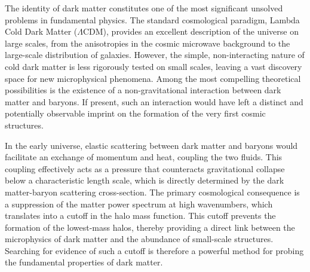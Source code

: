 \documentclass[]{article}
\begin{document}
The identity of dark matter constitutes one of the most significant unsolved problems in fundamental physics.\citep{bahcall2016dark} The standard cosmological paradigm, Lambda Cold Dark Matter ($\Lambda$CDM), provides an excellent description of the universe on large scales, from the anisotropies in the cosmic microwave background to the large-scale distribution of galaxies.\citep{van_den_Aarssen_2012,vandenaarssen2013is,chatterjee2024rulingstronglyinteractingdark,martins2009distributiondarkmattergalaxies,speliotopoulos2007darkenergystructureformation,teixeira2024illuminatingdarksectorsearching} However, the simple, non-interacting nature of cold dark matter is less rigorously tested on small scales, leaving a vast discovery space for new microphysical phenomena.\citep{van_den_Aarssen_2012,vandenaarssen2013is,chatterjee2024rulingstronglyinteractingdark,martins2009distributiondarkmattergalaxies,speliotopoulos2007darkenergystructureformation,brito2022snowmass2021cosmicfrontierwhite} Among the most compelling theoretical possibilities is the existence of a non-gravitational interaction between dark matter and baryons.\citep{van_den_Aarssen_2012,vandenaarssen2013is} If present, such an interaction would have left a distinct and potentially observable imprint on the formation of the very first cosmic structures.\citep{gluscevic2019cosmologicalprobesdarkmatter,chatterjee2024rulingstronglyinteractingdark,Wang_2016,brito2022snowmass2021cosmicfrontierwhite}

In the early universe, elastic scattering between dark matter and baryons would facilitate an exchange of momentum and heat, coupling the two fluids.\citep{tashiro2014effectsdarkmatterbaryonscattering,short2022darkmatterbaryonscatteringeffects} This coupling effectively acts as a pressure that counteracts gravitational collapse below a characteristic length scale, which is directly determined by the dark matter-baryon scattering cross-section. The primary cosmological consequence is a suppression of the matter power spectrum at high wavenumbers, which translates into a cutoff in the halo mass function.\citep{short2022darkmatterbaryonscatteringeffects,Sameie_2019,Schaeffer_2021,Bose_2019} This cutoff prevents the formation of the lowest-mass halos, thereby providing a direct link between the microphysics of dark matter and the abundance of small-scale structures.\citep{Sameie_2019,Diaz_Rivero_2018,moustakas2009stronggravitationallensingprobes,Schaeffer_2021} Searching for evidence of such a cutoff is therefore a powerful method for probing the fundamental properties of dark matter.\citep{Diaz_Rivero_2018,moustakas2009stronggravitationallensingprobes,Schaeffer_2021}
\end{document}
